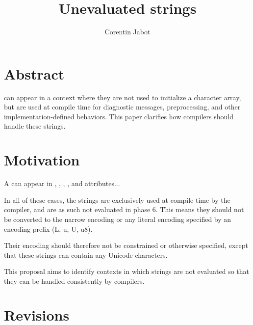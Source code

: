 \documentclass{wg21}
\title{Unevaluated strings}
\author{Corentin Jabot}{corentin.jabot@gmail.com}
\begin{document}
\maketitle

\section{Abstract}

 can appear in a context where they are not used to
initialize a character array, but are used at compile time for diagnostic messages,
preprocessing, and other implementation-defined behaviors.
This paper clarifies how compilers should handle these strings.


\section{Motivation}

A  can appear in , , ,
, \tcode{[[deprecated]]} and \tcode{[[nodiscard]]} attributes...

In all of these cases, the strings are exclusively used at compile time by the compiler, and are as such not evaluated in phase 6.
This means they should not be converted to the narrow encoding or any literal encoding specified by an encoding prefix (L, u, U, u8).

Their encoding should therefore not be constrained or otherwise specified,
except that these strings can contain any Unicode characters.

This proposal aims to identify contexts in which strings are not evaluated so that they can be handled consistently by compilers.

\section{Revisions}
\end{document}
